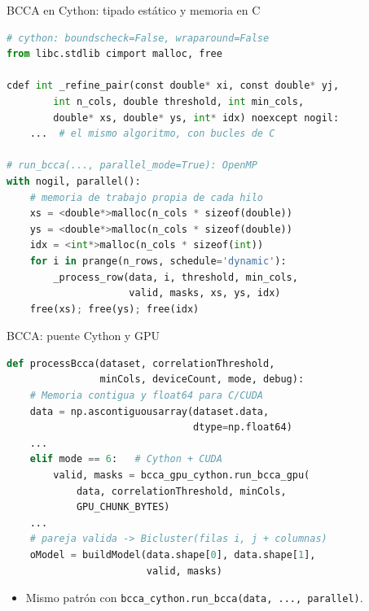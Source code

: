 \documentclass[10pt,aspectratio=169]{beamer}
\makeatletter
\newcommand{\hlcheck}[1]{\color{backcolor}\@for\hl@n:=#1\do{\ifnum\value{lstnumber}=\hl@n\relax\color{hlcolor}\fi}}
\makeatother
\begin{document}
\begin{frame}[fragile]{BCCA en Cython: tipado estático y memoria en C}
\begin{lstlisting}[language=Python,basicstyle=\ttfamily\footnotesize,linebackgroundcolor={\hlcheck{1,4,5,6,11,12,15}}]
# cython: boundscheck=False, wraparound=False
from libc.stdlib cimport malloc, free

cdef int _refine_pair(const double* xi, const double* yj,
        int n_cols, double threshold, int min_cols,
        double* xs, double* ys, int* idx) noexcept nogil:
    ...  # el mismo algoritmo, con bucles de C

# run_bcca(..., parallel_mode=True): OpenMP
with nogil, parallel():
    # memoria de trabajo propia de cada hilo
    xs = <double*>malloc(n_cols * sizeof(double))
    ys = <double*>malloc(n_cols * sizeof(double))
    idx = <int*>malloc(n_cols * sizeof(int))
    for i in prange(n_rows, schedule='dynamic'):
        _process_row(data, i, threshold, min_cols,
                     valid, masks, xs, ys, idx)
    free(xs); free(ys); free(idx)
\end{lstlisting}
\end{frame}

\begin{frame}[fragile]{BCCA: puente Cython y GPU}
\begin{lstlisting}[language=Python,basicstyle=\ttfamily\footnotesize,linebackgroundcolor={\hlcheck{3,4,5,8,9,10}}]
def processBcca(dataset, correlationThreshold,
                minCols, deviceCount, mode, debug):
    # Memoria contigua y float64 para C/CUDA
    data = np.ascontiguousarray(dataset.data,
                                dtype=np.float64)
    ...
    elif mode == 6:   # Cython + CUDA
        valid, masks = bcca_gpu_cython.run_bcca_gpu(
            data, correlationThreshold, minCols,
            GPU_CHUNK_BYTES)
    ...
    # pareja valida -> Bicluster(filas i, j + columnas)
    oModel = buildModel(data.shape[0], data.shape[1],
                        valid, masks)
\end{lstlisting}
    \vspace{0.1cm}
    \begin{itemize}
        \item Mismo patrón con \texttt{bcca\_cython.run\_bcca(data, ..., parallel)}.
    \end{itemize}
\end{frame}
\end{document}
